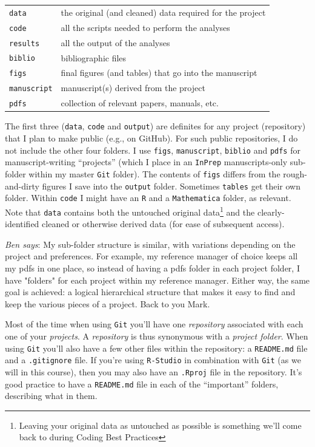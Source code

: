 \documentclass[12pt,letterpaper]{article}
\newenvironment{ben}{\quote\justify\fontfamily{cmtt}\selectfont\small}{\par}
\begin{document}
\begin{tabular}{ll}
 \texttt{data} & the original (and cleaned) data required for the project\\
 \texttt{code} & all the scripts needed to perform the analyses \\
 \texttt{results} & all the output of the analyses \\
 \texttt{biblio} & bibliographic files\\
 \texttt{figs} & final figures (and tables) that go into the manuscript\\
 \texttt{manuscript} & manuscript(s) derived from the project\\
 \texttt{pdfs} & collection of relevant papers, manuals, etc.\\
\end{tabular}

\noindent
The first three (\texttt{data}, \texttt{code} and \texttt{output}) are definites for any project (repository) that I plan to make public (e.g., on GitHub).
For such public repositories, I do not include the other four folders.
I use \texttt{figs}, \texttt{manuscript}, \texttt{biblio} and \texttt{pdfs} for manuscript-writing ``projects'' (which I place in an \texttt{InPrep} manuscripts-only sub-folder within my master \texttt{Git} folder).
The contents of \texttt{figs} differs from the rough-and-dirty figures I save into the \texttt{output} folder.
Sometimes \texttt{tables} get their own folder.
Within \texttt{code} I might have an \texttt{R} and a \texttt{Mathematica} folder, as relevant.
Note that \texttt{data} contains both the untouched original data\footnote{Leaving your original data as untouched as possible is something we'll come back to during Coding Best Practices} and the clearly-identified cleaned or otherwise derived data (for ease of subsequent access).

\begin{ben}
	\textit{Ben says}: My sub-folder structure is similar, with variations depending on the project and preferences. For example, my reference manager of choice keeps all my pdfs in one place, so instead of having a pdfs folder in each project folder, I have "folders" for each project within my reference manager. Either way, the same goal is achieved: a logical hierarchical structure that makes it easy to find and keep the various pieces of a project. Back to you Mark.
\end{ben}

Most of the time when using \texttt{Git} you'll have one \emph{repository} associated with each one of your \emph{projects}.  A \emph{repository} is thus synonymous with a \emph{project folder}.  When using \texttt{Git} you'll also have a few other files within the repository: a \texttt{README.md} file and a \texttt{.gitignore} file.  If you're using \texttt{R-Studio} in combination with \texttt{Git} (as we will in this course), then you may also have an \texttt{.Rproj} file in the repository.  It's good practice to have a \texttt{README.md} file in each of the ``important'' folders, describing what in them.
\end{document}
